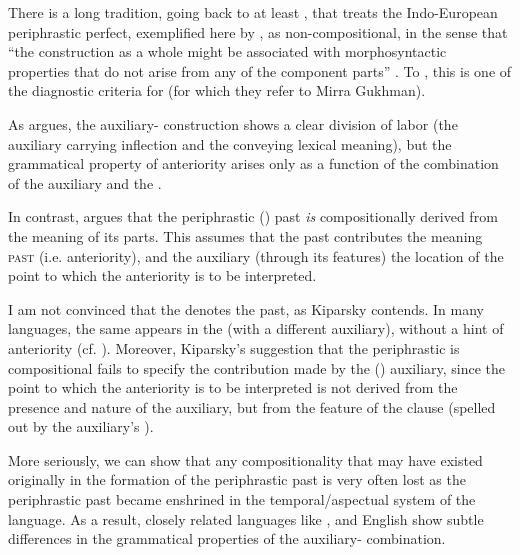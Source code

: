 \documentclass[output=paper]{LSP/langsci}
\begin{document}
There is a long tradition, going back to at least \citet{Benveniste19651974}, that treats the Indo-European periphrastic perfect, exemplified here by , as non-compositional, in the sense that “the construction as a whole might be associated with morphosyntactic properties that do not arise from any of the component parts” \citep[211]{SpencerPopova2015}. To \citet{AckermanStump2004}, this is one of the diagnostic criteria for  (for which they refer to Mirra Gukhman).

As \citet[184]{Benveniste19651974} argues, the auxiliary- construction shows a clear division of labor (the auxiliary carrying inflection and the  conveying lexical meaning), but the grammatical property of anteriority arises only as a function of the combination of the auxiliary and the .

In contrast, \citet[123]{Kiparsky2005} argues that the periphrastic () past \textit{is} compositionally derived from the meaning of its parts. This assumes that the past  contributes the meaning \textsc{past} (i.e. anteriority), and the auxiliary (through its  features) the location of the  point  to which the anteriority is to be interpreted. 

I am not convinced that the  denotes the past, as Kiparsky contends. In many languages, the same  appears in the  (with a different auxiliary), without a hint of anteriority (cf. \citealt[288--289]{Wackernagel1920}). Moreover, Kiparsky’s suggestion that the periphrastic  is compositional fails to specify the contribution made by the () auxiliary, since the  point  to which the anteriority is to be interpreted is not derived from the presence and nature of the auxiliary, but from the  feature of the clause (spelled out by the auxiliary’s  ).

More seriously, we can show that any compositionality that may have existed originally in the formation of the periphrastic past is very often lost as the periphrastic past became enshrined in the temporal/aspectual system of the language. As a result, closely related languages like ,  and English show subtle differences in the grammatical properties of the auxiliary- combination. 
\end{document}
